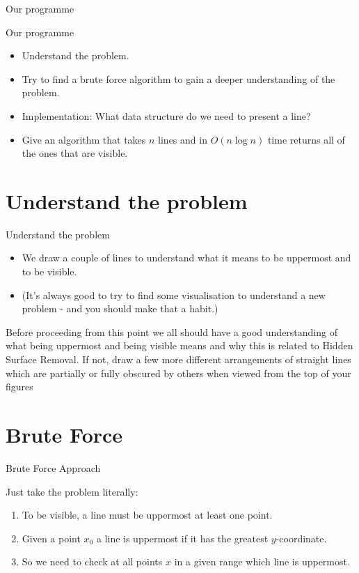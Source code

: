\documentclass{article}
\providecommand{\tightlist}{%
  \setlength{\itemsep}{0pt}\setlength{\parskip}{0pt}}
\begin{document}
\begin{frame}{Our programme}

\begin{block}{Our programme}

\begin{itemize}[<+->]
\tightlist
\item
  Understand the problem.
\item
  Try to find a brute force algorithm to gain a deeper understanding of the problem.
 \item
  Implementation: What data structure do we need to present a line?
\item
  Give an algorithm that takes \(n\) lines and in \(O(n\log n)\) time
  returns all of the ones that are visible.
\end{itemize}

\end{block}

\end{frame}

\section{Understand the problem}

\begin{frame}{Understand the problem}

\begin{itemize}
    \item We draw a couple of lines to understand what it means to be uppermost and to be visible. 
    \item (It's always good to try to find some visualisation to understand a new problem - and you should make that a habit.)
\end{itemize}
    
Before proceeding from this point we all should have a good understanding of what being uppermost and being visible means and why this is related to Hidden Surface Removal. If not, draw a few more different arrangements of straight lines which are partially or fully obscured by others when viewed from the top of your figures
\end{frame}

\section{Brute Force}

\begin{frame}{Brute Force Approach}

  Just take the problem literally:
  \begin{enumerate}
  \item To be visible, a line must be uppermost at least one point.
  \item Given a point $x_0$ a line is uppermost if it has the greatest $y$-coordinate.
  \item So we need to check at all points $x$ in a given range which line is uppermost.
  \end{enumerate}
\end{frame}
\end{document}
